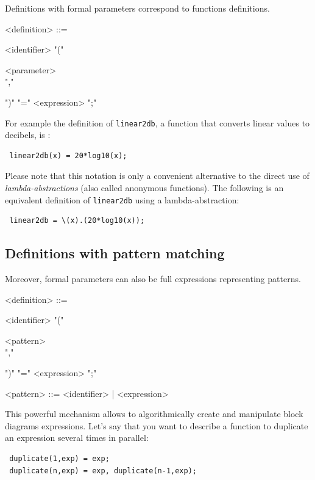 \documentclass[a4paper]{book}
\begin{document}
Definitions with formal parameters correspond to functions definitions.


\begin{grammar}
  <definition> ::= 
  \begin{syntdiag}
    <identifier> "(" 
    \begin{rep}
      <parameter> \\ ","
    \end{rep}
    ")" "=" <expression> ";"
  \end{syntdiag}
\end{grammar}

For example the definition of \lstinline'linear2db', a function that converts linear values to decibels, is :

\begin{lstlisting}
 linear2db(x) = 20*log10(x);
\end{lstlisting}
 
Please note that this notation is only a convenient alternative to the direct use of \textit{lambda-abstractions} (also called anonymous functions). The following is an equivalent definition of \lstinline'linear2db' using a lambda-abstraction:

\begin{lstlisting}
 linear2db = \(x).(20*log10(x));
\end{lstlisting}


\subsection{Definitions with pattern matching}

Moreover, formal parameters can also be full expressions representing patterns. 

\begin{grammar}
  <definition> ::= 
  \begin{syntdiag}
    <identifier> "(" 
    \begin{rep}
      <pattern> \\ ","
    \end{rep}
    ")" "=" <expression> ";"
  \end{syntdiag}
\end{grammar}

\begin{grammar}
  <pattern> ::= 
    <identifier> |  <expression>
\end{grammar}

This powerful mechanism allows to algorithmically create and manipulate block diagrams expressions. Let's say that you want to describe a function to duplicate an expression several times in parallel:
\begin{lstlisting}
 duplicate(1,exp) = exp;
 duplicate(n,exp) = exp, duplicate(n-1,exp);
\end{lstlisting}
\end{document}
